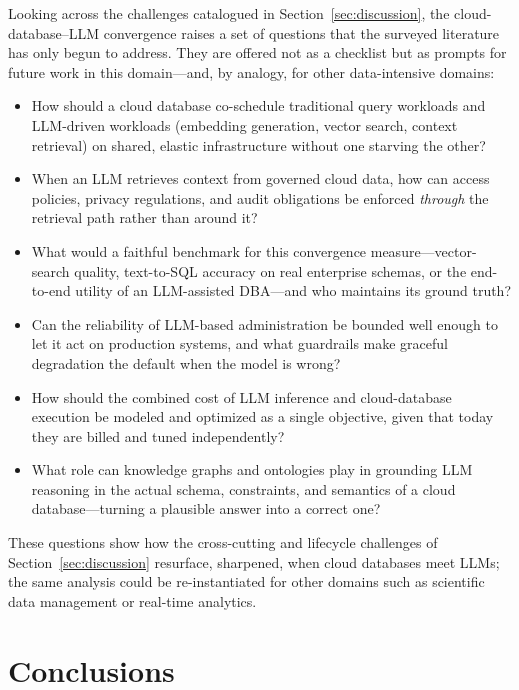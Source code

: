 \documentclass[a4paper,fleqn]{cas-sc}
\begin{document}
Looking across the challenges catalogued in Section~\ref{sec:discussion}, the cloud-database--LLM convergence raises a set of questions that the surveyed literature has only begun to address. They are offered not as a checklist but as prompts for future work in this domain---and, by analogy, for other data-intensive domains:
\begin{itemize}
  \item How should a cloud database co-schedule traditional query workloads and LLM-driven workloads (embedding generation, vector search, context retrieval) on shared, elastic infrastructure without one starving the other?
  \item When an LLM retrieves context from governed cloud data, how can access policies, privacy regulations, and audit obligations be enforced \emph{through} the retrieval path rather than around it?
  \item What would a faithful benchmark for this convergence measure---vector-search quality, text-to-SQL accuracy on real enterprise schemas, or the end-to-end utility of an LLM-assisted DBA---and who maintains its ground truth?
  \item Can the reliability of LLM-based administration be bounded well enough to let it act on production systems, and what guardrails make graceful degradation the default when the model is wrong?
  \item How should the combined cost of LLM inference and cloud-database execution be modeled and optimized as a single objective, given that today they are billed and tuned independently?
  \item What role can knowledge graphs and ontologies play in grounding LLM reasoning in the actual schema, constraints, and semantics of a cloud database---turning a plausible answer into a correct one?
\end{itemize}

These questions show how the cross-cutting and lifecycle challenges of Section~\ref{sec:discussion} resurface, sharpened, when cloud databases meet LLMs; the same analysis could be re-instantiated for other domains such as scientific data management or real-time analytics.


\section{Conclusions}
\label{sec:conclusion}
\end{document}
